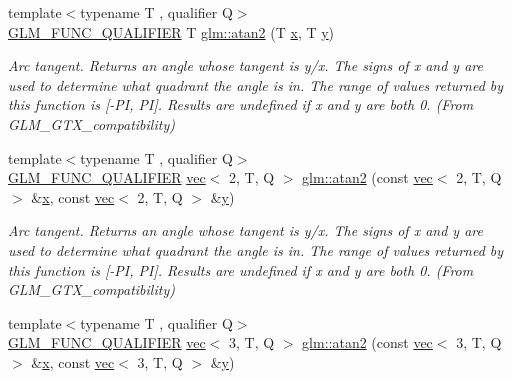 \begin{DoxyCompactItemize}
{\footnotesize template$<$typename T , qualifier Q$>$ }\\\mbox{\hyperlink{setup_8hpp_a33fdea6f91c5f834105f7415e2a64407}{G\+L\+M\+\_\+\+F\+U\+N\+C\+\_\+\+Q\+U\+A\+L\+I\+F\+I\+ER}} T \mbox{\hyperlink{group__gtx__compatibility_gac63011205bf6d0be82589dc56dd26708}{glm\+::atan2}} (T \mbox{\hyperlink{_s_d_l__opengl_8h_ad0e63d0edcdbd3d79554076bf309fd47}{x}}, T \mbox{\hyperlink{_s_d_l__opengl_8h_a1675d9d7bb68e1657ff028643b4037e3}{y}})
\begin{DoxyCompactList}\small\item\em Arc tangent. Returns an angle whose tangent is y/x. The signs of x and y are used to determine what quadrant the angle is in. The range of values returned by this function is \mbox{[}-\/\+PI, PI\mbox{]}. Results are undefined if x and y are both 0. (From G\+L\+M\+\_\+\+G\+T\+X\+\_\+compatibility) \end{DoxyCompactList}\item 
{\footnotesize template$<$typename T , qualifier Q$>$ }\\\mbox{\hyperlink{setup_8hpp_a33fdea6f91c5f834105f7415e2a64407}{G\+L\+M\+\_\+\+F\+U\+N\+C\+\_\+\+Q\+U\+A\+L\+I\+F\+I\+ER}} \mbox{\hyperlink{structglm_1_1vec}{vec}}$<$ 2, T, Q $>$ \mbox{\hyperlink{group__gtx__compatibility_ga83bc41bd6f89113ee8006576b12bfc50}{glm\+::atan2}} (const \mbox{\hyperlink{structglm_1_1vec}{vec}}$<$ 2, T, Q $>$ \&\mbox{\hyperlink{_s_d_l__opengl_8h_ad0e63d0edcdbd3d79554076bf309fd47}{x}}, const \mbox{\hyperlink{structglm_1_1vec}{vec}}$<$ 2, T, Q $>$ \&\mbox{\hyperlink{_s_d_l__opengl_8h_a1675d9d7bb68e1657ff028643b4037e3}{y}})
\begin{DoxyCompactList}\small\item\em Arc tangent. Returns an angle whose tangent is y/x. The signs of x and y are used to determine what quadrant the angle is in. The range of values returned by this function is \mbox{[}-\/\+PI, PI\mbox{]}. Results are undefined if x and y are both 0. (From G\+L\+M\+\_\+\+G\+T\+X\+\_\+compatibility) \end{DoxyCompactList}\item 
{\footnotesize template$<$typename T , qualifier Q$>$ }\\\mbox{\hyperlink{setup_8hpp_a33fdea6f91c5f834105f7415e2a64407}{G\+L\+M\+\_\+\+F\+U\+N\+C\+\_\+\+Q\+U\+A\+L\+I\+F\+I\+ER}} \mbox{\hyperlink{structglm_1_1vec}{vec}}$<$ 3, T, Q $>$ \mbox{\hyperlink{group__gtx__compatibility_gac39314f5087e7e51e592897cabbc1927}{glm\+::atan2}} (const \mbox{\hyperlink{structglm_1_1vec}{vec}}$<$ 3, T, Q $>$ \&\mbox{\hyperlink{_s_d_l__opengl_8h_ad0e63d0edcdbd3d79554076bf309fd47}{x}}, const \mbox{\hyperlink{structglm_1_1vec}{vec}}$<$ 3, T, Q $>$ \&\mbox{\hyperlink{_s_d_l__opengl_8h_a1675d9d7bb68e1657ff028643b4037e3}{y}})

\end{DoxyCompactItemize}
